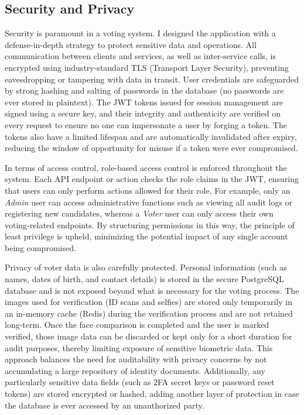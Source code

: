 \documentclass[a4paper,10pt]{report}
\begin{document}
\subsection{Security and Privacy}
Security is paramount in a voting system. I designed the application with a defense-in-depth strategy to protect sensitive data and operations. All communication between clients and services, as well as inter-service calls, is encrypted using industry-standard TLS (Transport Layer Security), preventing eavesdropping or tampering with data in transit. User credentials are safeguarded by strong hashing and salting of passwords in the database (no passwords are ever stored in plaintext). The JWT tokens issued for session management are signed using a secure key, and their integrity and authenticity are verified on every request to ensure no one can impersonate a user by forging a token. The tokens also have a limited lifespan and are automatically invalidated after expiry, reducing the window of opportunity for misuse if a token were ever compromised.

In terms of access control, role-based access control is enforced throughout the system. Each API endpoint or action checks the role claims in the JWT, ensuring that users can only perform actions allowed for their role. For example, only an \emph{Admin} user can access administrative functions such as viewing all audit logs or registering new candidates, whereas a \emph{Voter} user can only access their own voting-related endpoints. By structuring permissions in this way, the principle of least privilege is upheld, minimizing the potential impact of any single account being compromised.

Privacy of voter data is also carefully protected. Personal information (such as names, dates of birth, and contact details) is stored in the secure PostgreSQL database and is not exposed beyond what is necessary for the voting process. The images used for verification (ID scans and selfies) are stored only temporarily in an in-memory cache (Redis) during the verification process and are not retained long-term. Once the face comparison is completed and the user is marked verified, those image data can be discarded or kept only for a short duration for audit purposes, thereby limiting exposure of sensitive biometric data. This approach balances the need for auditability with privacy concerns by not accumulating a large repository of identity documents. Additionally, any particularly sensitive data fields (such as 2FA secret keys or password reset tokens) are stored encrypted or hashed, adding another layer of protection in case the database is ever accessed by an unauthorized party.
\end{document}
